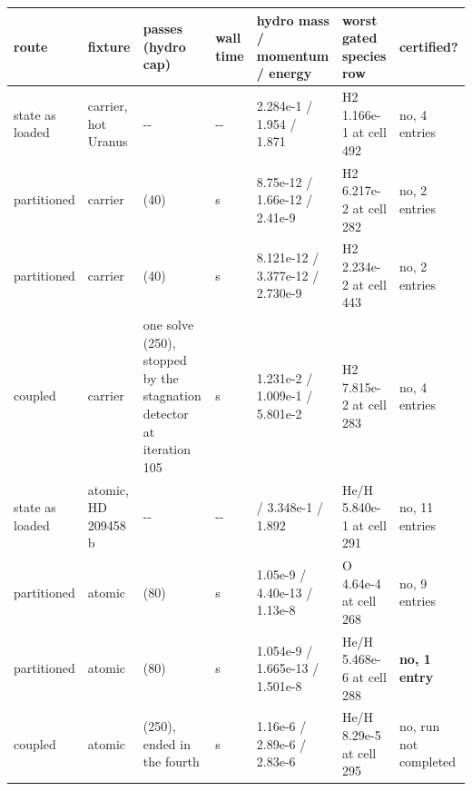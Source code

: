 \documentclass[english,a4paper]{my_memo}
\begin{document}
{\def\LTcaptype{none} %
{\small
\begin{longtable}[]{@{}>{\raggedright\arraybackslash}p{\dimexpr(\linewidth-14\tabcolsep)/7\relax}>{\raggedright\arraybackslash}p{\dimexpr(\linewidth-14\tabcolsep)/7\relax}>{\raggedright\arraybackslash}p{\dimexpr(\linewidth-14\tabcolsep)/7\relax}>{\raggedright\arraybackslash}p{\dimexpr(\linewidth-14\tabcolsep)/7\relax}>{\raggedright\arraybackslash}p{\dimexpr(\linewidth-14\tabcolsep)/7\relax}>{\raggedright\arraybackslash}p{\dimexpr(\linewidth-14\tabcolsep)/7\relax}>{\raggedright\arraybackslash}p{\dimexpr(\linewidth-14\tabcolsep)/7\relax}@{}}
\toprule\noalign{}
route & fixture & passes (hydro cap) & wall time & hydro mass / momentum / energy & worst gated species row & certified? \\
\midrule\noalign{}
\endhead
\bottomrule\noalign{}
\endlastfoot
state as loaded & carrier, hot Uranus & -\/- & -\/- & 2.284e-1 / 1.954 / 1.871 & H2 1.166e-1 at cell 492 & no, 4 entries \\
partitioned & carrier & 8 (40) & 173 s & 8.75e-12 / 1.66e-12 / 2.41e-9 & H2 6.217e-2 at cell 282 & no, 2 entries \\
partitioned & carrier & 40 (40) & 831 s & 8.121e-12 / 3.377e-12 / 2.730e-9 & H2 2.234e-2 at cell 443 & no, 2 entries \\
coupled & carrier & one solve (250), stopped by the stagnation detector at iteration 105 & 321 s & 1.231e-2 / 1.009e-1 / 5.801e-2 & H2 7.815e-2 at cell 283 & no, 4 entries \\
state as loaded & atomic, HD 209458 b & -\/- & -\/- & 1.509 / 3.348e-1 / 1.892 & He/H 5.840e-1 at cell 291 & no, 11 entries \\
partitioned & atomic & 5 (80) & 528 s & 1.05e-9 / 4.40e-13 / 1.13e-8 & O 4.64e-4 at cell 268 & no, 9 entries \\
partitioned & atomic & 12 (80) & 1043 s & 1.054e-9 / 1.665e-13 / 1.501e-8 & He/H 5.468e-6 at cell 288 & \textbf{no, 1 entry} \\
coupled & atomic & 3 (250), ended in the fourth & 2392 s & 1.16e-6 / 2.89e-6 / 2.83e-6 & He/H 8.29e-5 at cell 295 & no, run not completed \\
\end{longtable}
}
}
\end{document}
